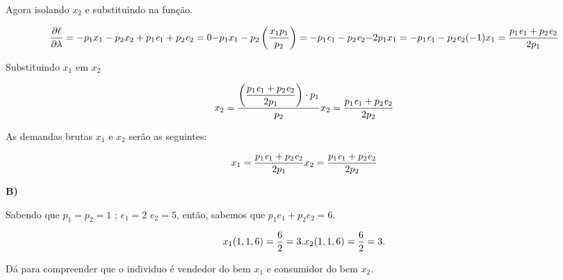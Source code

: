\begin{flushleft}
\begin{center}
	Agora isolando $x_{2}$ e substituindo na função.
\end{center}

\begin{equation}
\frac{\partial\ell}{\partial \lambda} = -p_{1}x_{1} - p_{2}x_{2} + p_{1}\textit{e}_{1} + p_{2}\textit{e}_{2} = 0
$$\\$$
-p_{1}x_{1} - p_{2}\left(\dfrac{x_{1}p_{1}}{p_{2}}\right) = -p_{1}\textit{e}_{1} - p_{2}\textit{e}_{2}
$$\\$$
-2p_{1}x_{1} = -p_{1}\textit{e}_{1} - p_{2}\textit{e}_{2} (-1)
$$\\$$
x_{1} = \dfrac{p_{1}\textit{e}_{1} + p_{2}\textit{e}_{2}}{2p_{1}}
\end{equation}

\begin{center}
	Substituindo $x_{1}$ em $x_{2}$
\end{center}

\begin{equation}
x_{2} = \dfrac{\left( \dfrac{p_{1}\textit{e}_{1} + p_{2}\textit{e}_{2}}{2p_{1}}\right)\cdot p_{1}}{p_{2}}
$$\\$$
x_{2} = \dfrac{p_{1}\textit{e}_{1} + p_{2}\textit{e}_{2}}{2p_{2}}
\end{equation}

\begin{center}
	As demandas brutas $x_{1}$ e $x_{2}$ serão as seguintes:
\end{center}

\begin{equation}
x_{1} = \dfrac{p_{1}\textit{e}_{1} + p_{2}\textit{e}_{2}}{2p_{1}}
$$\\$$
x_{2} = \dfrac{p_{1}\textit{e}_{1} + p_{2}\textit{e}_{2}}{2p_{2}}
\end{equation}

\singlespacing

\textbf{B)}

Sabendo que $p_{1} = p_{2} = 1$ ; $\textit{e}_{1} = 2$  $\textit{e}_{2} = 5$, então, sabemos que $p_{1}\textit{e}_{1} + p_{2}\textit{e}_{2} = 6$.

\begin{equation}
x_{1}(1,1,6) = \dfrac{6}{2} = 3.
$$\\$$
x_{2}(1,1,6) = \dfrac{6}{2} = 3.
\end{equation}

\begin{center}
	Dá para compreender que o individuo é vendedor do bem $x_{1}$ e consumidor do bem $x_{2}$.
\end{center}


\end{flushleft}
